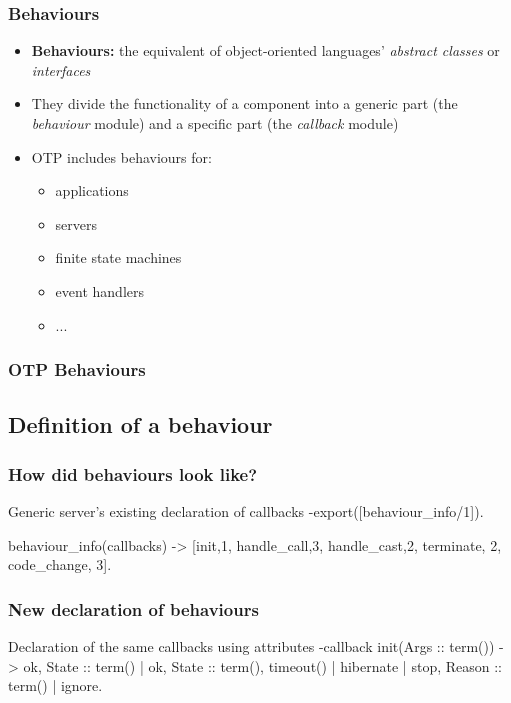 \documentclass{beamer}
\begin{document}
\begin{frame}
  \frametitle{Behaviours}
  \begin{itemize}
  \item \textbf{Behaviours:} the equivalent of object-oriented
    languages' \emph{abstract classes} or \emph{interfaces} \pause
  \item They divide the functionality of a component into a generic
    part (the \emph{behaviour} module) and a specific part (the
    \emph{callback} module) \pause
  \item OTP includes behaviours for:
    \begin{itemize}
    \item applications
    \item servers
    \item finite state machines
    \item event handlers
    \item ...
    \end{itemize}
  \end{itemize}
\end{frame}

\begin{frame}
  \frametitle{OTP Behaviours}
  
\end{frame}

\subsection{Definition of a behaviour}

\begin{frame}[fragile]
  \frametitle{How did behaviours look like?}
\begin{code}{Generic server's existing declaration of callbacks}
-export([behaviour_info/1]).

behaviour_info(callbacks) ->
  [{init,1}, {handle_call,3}, {handle_cast,2},
   {terminate, 2}, {code_change, 3}].

\end{code}
\end{frame}

\begin{frame}[fragile]
  \frametitle{New declaration of behaviours}
\begin{code}{Declaration of the same callbacks using attributes}
-callback init(Args :: term()) ->
    {ok, State :: term()} |
    {ok, State :: term(), timeout() | hibernate} |
    {stop, Reason :: term()} | 
    ignore.

\end{code}
\end{frame}
\end{document}
